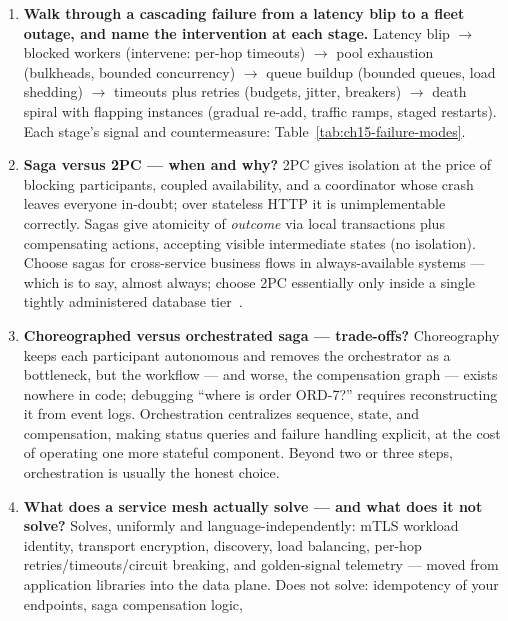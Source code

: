 \begin{enumerate}[label=\textbf{Q\arabic*.}, leftmargin=1.6cm, start=21]
  \item \textbf{Walk through a cascading failure from a latency blip to a
        fleet outage, and name the intervention at each stage.}
        Latency blip $\to$ blocked workers (intervene: per-hop timeouts)
        $\to$ pool exhaustion (bulkheads, bounded concurrency) $\to$ queue
        buildup (bounded queues, load shedding) $\to$ timeouts plus retries
        (budgets, jitter, breakers) $\to$ death spiral with flapping
        instances (gradual re-add, traffic ramps, staged restarts). Each
        stage's signal and countermeasure:
        Table~\ref{tab:ch15-failure-modes}.
  \item \textbf{Saga versus 2PC --- when and why?}
        2PC gives isolation at the price of blocking participants, coupled
        availability, and a coordinator whose crash leaves everyone
        in-doubt; over stateless HTTP it is unimplementable correctly.
        Sagas give atomicity of \emph{outcome} via local transactions plus
        compensating actions, accepting visible intermediate states
        (no isolation). Choose sagas for cross-service business flows in
        always-available systems --- which is to say, almost always; choose
        2PC essentially only inside a single tightly administered database
        tier~\cite{kleppmann2017ddia}.
  \item \textbf{Choreographed versus orchestrated saga --- trade-offs?}
        Choreography keeps each participant autonomous and removes the
        orchestrator as a bottleneck, but the workflow --- and worse, the
        compensation graph --- exists nowhere in code; debugging
        ``where is order ORD-7?'' requires reconstructing it from event
        logs. Orchestration centralizes sequence, state, and compensation,
        making status queries and failure handling explicit, at the cost of
        operating one more stateful component. Beyond two or three steps,
        orchestration is usually the honest choice.
  \item \textbf{What does a service mesh actually solve --- and what does
        it not solve?}
        Solves, uniformly and language-independently: mTLS workload
        identity, transport encryption, discovery, load balancing, per-hop
        retries/timeouts/circuit breaking, and golden-signal telemetry ---
        moved from application libraries into the data plane. Does not
        solve: idempotency of your endpoints, saga compensation logic,

\end{enumerate}
